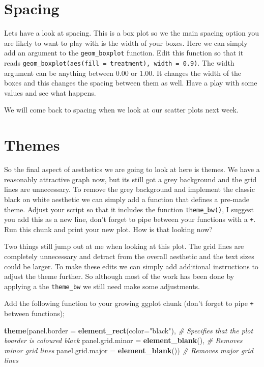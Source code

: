 \documentclass[
]{book}
\newenvironment{Shaded}{\begin{snugshade}}{\end{snugshade}}
\newcommand{\AttributeTok}[1]{\textcolor[rgb]{0.13,0.29,0.53}{#1}}
\newcommand{\CommentTok}[1]{\textcolor[rgb]{0.56,0.35,0.01}{\textit{#1}}}
\newcommand{\FunctionTok}[1]{\textcolor[rgb]{0.13,0.29,0.53}{\textbf{#1}}}
\newcommand{\NormalTok}[1]{#1}
\newcommand{\StringTok}[1]{\textcolor[rgb]{0.31,0.60,0.02}{#1}}
\begin{document}
\section{Spacing}\label{spacing}

Lets have a look at spacing. This is a box plot so we the main spacing option you are likely to want to play with is the width of your boxes. Here we can simply add an argument to the \texttt{geom\_boxplot} function. Edit this function so that it reads \texttt{geom\_boxplot(aes(fill\ =\ treatment),\ width\ =\ 0.9)}. The width argument can be anything between 0.00 or 1.00. It changes the width of the boxes and this changes the spacing between them as well. Have a play with some values and see what happens.

We will come back to spacing when we look at our scatter plots next week.

\section{Themes}\label{themes}

So the final aspect of aesthetics we are going to look at here is themes. We have a reasonably attractive graph now, but its still got a grey background and the grid lines are unnecessary. To remove the grey background and implement the classic black on white aesthetic we can simply add a function that defines a pre-made theme. Adjust your script so that it includes the function \texttt{theme\_bw()}, I suggest you add this as a new line, don't forget to pipe between your functions with a \texttt{+}. Run this chunk and print your new plot. How is that looking now?

Two things still jump out at me when looking at this plot. The grid lines are completely unnecessary and detract from the overall aesthetic and the text sizes could be larger. To make these edits we can simply add additional instructions to adjust the theme further. So although most of the work has been done by applying a the \texttt{theme\_bw} we still need make some adjustments.

Add the following function to your growing ggplot chunk (don't forget to pipe \texttt{+} between functions);

\begin{Shaded}
\begin{Highlighting}[]
\FunctionTok{theme}\NormalTok{(}\AttributeTok{panel.border =} \FunctionTok{element\_rect}\NormalTok{(}\AttributeTok{color=}\StringTok{"black"}\NormalTok{), }\CommentTok{\# Specifies that the plot boarder is coloured black}
        \AttributeTok{panel.grid.minor =} \FunctionTok{element\_blank}\NormalTok{(), }\CommentTok{\# Removes minor grid lines }
        \AttributeTok{panel.grid.major =} \FunctionTok{element\_blank}\NormalTok{()) }\CommentTok{\# Removes major grid lines }
\end{Highlighting}
\end{Shaded}
\end{document}
